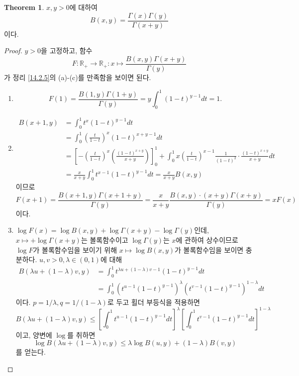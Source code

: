 \documentclass[11pt]{book}
\numberwithin{equation}{chapter}
\def\RR{\mathbb{R}}
\newcommand{\paren}[1]{\left(#1\right)}
\newcommand{\sqbracket}[1]{\left[#1\right]}
\theoremstyle{definition}
\newtheorem{thm}{Theorem}[section]
\newenvironment{enum}
	{\begin{enumerate}[label=(\alph*), leftmargin=2\parindent]}
	{\end{enumerate}}
\begin{document}
\begin{thm}
    \(x, y > 0\)에 대하여
    \[
    B(x, y) = \frac{\Gamma(x)\Gamma(y)}{\Gamma(x+y)}    
    \]
    이다.
\end{thm}
\begin{proof}
    \(y > 0\)을 고정하고, 함수
    \[
    F : \RR_+ \to \RR_+ : x \mapsto \frac{B(x, y) \Gamma(x+y)}{\Gamma(y)}    
    \]
    가 정리 \ref{14.2.5}의 (a)-(c)를 만족함을 보이면 된다.
    \begin{enum}
        \item
        \[
        F(1) = \frac{B(1, y) \Gamma(1+y)}{\Gamma(y)} = y \int_0^1 (1-t)^{y-1} dt = 1.    
        \]
        \item
        \begin{align*}
            B(x+1, y) &= \int_0^1 t^x(1-t)^{y-1} dt\\
            &= \int_0^1 \paren{\frac{t}{1-t}}^x (1-t)^{x+y-1} dt\\
            &= \sqbracket{-\paren{\frac{t}{1-t}}^x \paren{\frac{(1-t)^{x+y}}{x+y}}}_0^1 + \int_0^1 x \paren{\frac{t}{1-t}}^{x-1} \frac{1}{(1-t)^2} \cdot \frac{(1-t)^{x+y}}{x+y} dt\\
            &= \frac{x}{x+y} \int_0^1 t^{x-1} (1-t)^{y-1} dt = \frac{x}{x+y} B(x, y)
        \end{align*}
        이므로
        \[
        F(x+1) = \frac{B(x+1, y) \Gamma(x+1+y)}{\Gamma(y)} = \frac{x}{x+y} \frac{B(x, y) \cdot (x+y)\Gamma(x+y)}{\Gamma(y)} = x F(x)
        \]
        이다.
        \item \(\log F(x) = \log B(x, y) + \log \Gamma(x+y) - \log \Gamma(y)\)인데, \(x \mapsto + \log \Gamma(x+y)\)는 볼록함수이고 \(\log \Gamma(y)\)는 \(x\)에 관하여 상수이므로 \(\log F\)가 볼록함수임을 보이기 위해 \(x \mapsto \log B(x, y)\)가 볼록함수임을 보이면 충분하다. \(u, v > 0, \lambda \in (0, 1)\)에 대해
        \begin{align*}
            B(\lambda u + (1-\lambda)v, y) &= \int_0^1 t^{\lambda u + (1-\lambda)v-1} (1-t)^{y-1} dt\\
            &= \int_0^1 (t^{u-1} (1-t)^{y-1})^\lambda (t^{v-1} (1-t)^{y-1})^{1-\lambda} dt
        \end{align*}
        이다. \(p = 1/\lambda, q = 1/(1-\lambda)\)로 두고 횔더 부등식을 적용하면
        \[
            B(\lambda u + (1-\lambda)v, y) \le \sqbracket{\int_0^1 t^{u-1} (1-t)^{y-1} dt}^\lambda \sqbracket{\int_0^1 t^{v-1} (1-t)^{y-1} dt}^{1-\lambda}
        \]
        이고, 양변에 \(\log\)를 취하면
        \[
        \log B(\lambda u + (1-\lambda)v, y) \le \lambda \log B(u, y) + (1-\lambda) B(v, y)  
        \]
        를 얻는다.
    \end{enum}
\end{proof}
\end{document}

